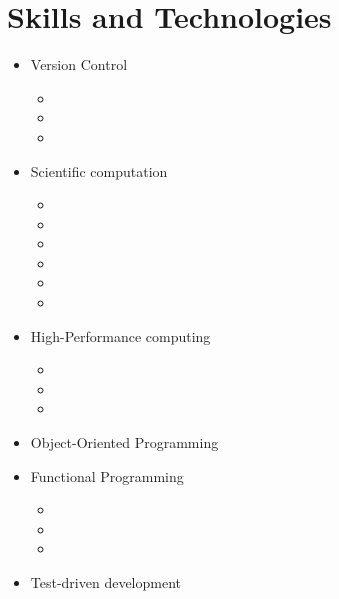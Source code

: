 \documentclass{CurriculumVitae}[10pt, draft, condensed]
\begin{document}
\section*{Skills and Technologies}

\begin{multicols}{4}
  
  \begin{itemize}[topsep=0pt]
    \setlength{\itemsep}{-0.3em}
  \item {\footnotesize Version Control}
    \begin{itemize}[topsep=0pt, partopsep=0pt]
      \setlength{\itemsep}{-0.3em}
    \item {}
    \item {}
    \item {}
    \end{itemize}
  \item {\footnotesize Scientific computation}
    \begin{itemize}[topsep=0pt, partopsep=0pt]
      \setlength{\itemsep}{-0.3em}
    \item {}
    \item {}
    \item {}
    \item {}
    \item {}
    \item {}
    \end{itemize}
  \item {\footnotesize High-Performance computing}
    \begin{itemize}[topsep=0pt, partopsep=0pt]
      \setlength{\itemsep}{-0.3em}
    \item {}
    \item {}
    \item {}
    \end{itemize}
  \item {\footnotesize Object-Oriented Programming}
  \item {\footnotesize Functional Programming}
    \begin{itemize}[topsep=0pt, partopsep=0pt]
      \setlength{\itemsep}{-0.3em}
    \item {}
    \item {}
    \item {}
    \end{itemize}
  \item {\footnotesize Test-driven development}

\end{itemize}
\end{multicols}
\end{document}
